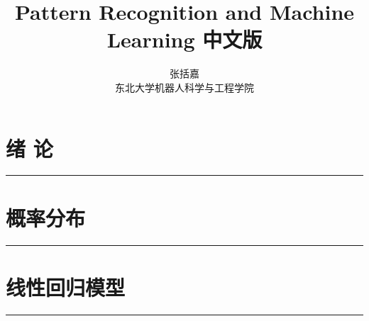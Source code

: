 \documentclass[b5paper]{book}
\author{张括嘉 \\ 东北大学机器人科学与工程学院}
\renewcommand {\thetable} {\thechapter{}.\arabic{table}}
\renewcommand {\thefigure} {\thechapter{}.\arabic{figure}}
\numberwithin{equation}{chapter}
\begin{document}
\title{Pattern Recognition and Machine Learning 中文版}
\date{}
	\chapter{绪 \quad 论}
	\noindent\rule[0.25\baselineskip]{\textwidth}{1pt}
	\renewcommand {\thetable} {\thechapter{}.\arabic{table}}
	\renewcommand {\thefigure} {\thechapter{}.\arabic{figure}}
	
	\chapter{概率分布}
	\noindent\rule[0.25\baselineskip]{\textwidth}{1pt}
	\renewcommand {\thetable} {\thechapter{}.\arabic{table}}
	\renewcommand {\thefigure} {\thechapter{}.\arabic{figure}}
	
	\chapter{线性回归模型}
	\noindent\rule[0.25\baselineskip]{\textwidth}{1pt}
	\renewcommand {\thetable} {\thechapter{}.\arabic{table}}
	\renewcommand {\thefigure} {\thechapter{}.\arabic{figure}}
	
\end{document}

